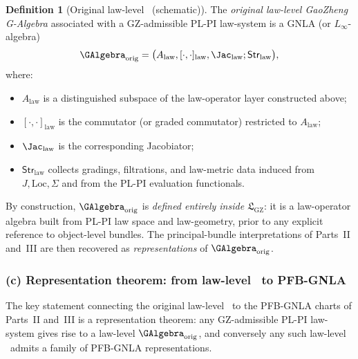 \documentclass[11pt]{book}
\theoremstyle{plain}
\theoremstyle{definition}
\newtheorem{definition}[theorem]{Definition} \theoremstyle{remark}
\newcommand{\GZLS}{\ensuremath{\mathfrak{L}_{\mathrm{GZ}}}}       \newcommand{\GZLT}{\ensuremath{M_{!w}}}                           \newcommand{\GZLOC}{\ensuremath{A_M}}                             \newcommand{\GZLCurv}{\ensuremath{\mathcal{F}_{\mathrm{law}}}}
\begin{document}
\begin{definition}[Original law-level \GAlgebra\ (schematic)]
The \emph{original law-level GaoZheng G-Algebra} associated with a
  GZ-admissible PL-PI law-system is a GNLA (or $L_\infty$-algebra)
  \[
     \GAlgebra_{\mathrm{orig}}
     =
     \bigl(
       A_{\mathrm{law}},
       [\cdot,\cdot]_{\mathrm{law}},
       \Jac_{\mathrm{law}};\mathsf{Str}_{\mathrm{law}}
     \bigr),
  \]
  where:
  \begin{itemize}
    \item $A_{\mathrm{law}}$ is a distinguished subspace of the
          law-operator layer constructed above;
    \item $[\cdot,\cdot]_{\mathrm{law}}$ is the commutator (or graded
          commutator) restricted to $A_{\mathrm{law}}$;
    \item $\Jac_{\mathrm{law}}$ is the corresponding Jacobiator;
    \item $\mathsf{Str}_{\mathrm{law}}$ collects gradings, filtrations,
          and law-metric data induced from $J,\mathrm{Loc},\Sigma$ and
          from the PL-PI evaluation functionals.
  \end{itemize}
\end{definition}

By construction, $\GAlgebra_{\mathrm{orig}}$ is \emph{defined entirely
inside \GZLS}: it is a law-operator algebra built from PL-PI law space
and law-geometry, prior to any explicit reference to object-level
bundles. The principal-bundle interpretations of Parts~II and~III are
then recovered as \emph{representations} of
$\GAlgebra_{\mathrm{orig}}$.



\subsubsection*{(c) Representation theorem: from law-level \GAlgebra\ to PFB-GNLA}

The key statement connecting the original law-level \GAlgebra\ to the
PFB-GNLA charts of Parts~II and~III is a representation theorem: any
GZ-admissible PL-PI law-system gives rise to a law-level
$\GAlgebra_{\mathrm{orig}}$, and conversely any such law-level
\GAlgebra\ admits a family of PFB-GNLA representations.
\end{document}
